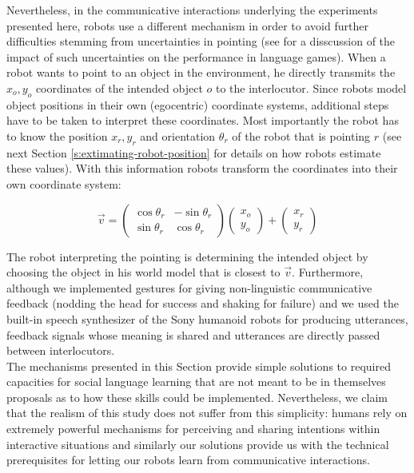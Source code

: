 Nevertheless, in the communicative interactions underlying the
experiments presented here, robots use a different mechanism in order
to avoid further difficulties stemming from uncertainties in pointing
(see \citealp{steels98stochasticity} for a disscussion of the impact
of such uncertainties on the performance in language games). When a
robot wants to point to an object in the environment, he directly
transmits the $x_o,y_o$ coordinates of the intended object $o$ to the
interlocutor.  Since robots model object positions in their own
(egocentric) coordinate systems, additional steps have to be taken to
interpret these coordinates.  Most importantly the robot has to know
the position $x_r,y_r$ and orientation $\theta_r$ of the robot that is
pointing $r$ (see next Section \ref{s:extimating-robot-position} for
details on how robots estimate these values).  With this information
robots transform the coordinates into their own coordinate system:

$$
\vec{v}=\begin{pmatrix} \cos \theta_r & -\sin \theta_r \\ \sin
  \theta_r & \cos \theta_r \end{pmatrix} \begin{pmatrix} x_o \\
  y_o\end{pmatrix} + \begin{pmatrix} x_r \\ y_r\end{pmatrix}
$$

\noindent The robot interpreting the pointing is determining the
intended object by choosing the object in his world model that is
closest to $\vec{v}$. Furthermore, although we implemented gestures
for giving non-linguistic communicative feedback (nodding the head for
success and shaking for failure) and we used the built-in speech
synthesizer of the Sony humanoid robots for producing utterances,
feedback signals whose meaning is shared and utterances are directly
passed between
interlocutors.\\

\noindent The mechanisms presented in this Section provide simple solutions to
required capacities for social language learning that are not meant to
be in themselves proposals as to how these skills could be
implemented. Nevertheless, we claim that the realism of this study
does not suffer from this simplicity: humans rely on extremely
powerful mechanisms for perceiving and sharing intentions within
interactive situations \citep{tomasello05understanding} and similarly
our solutions provide us with the technical prerequisites for letting
our robots learn from communicative interactions.



